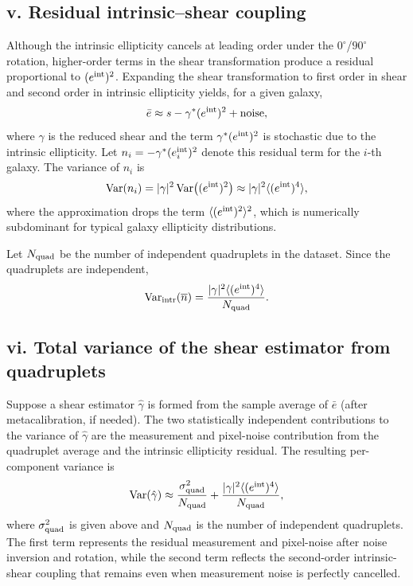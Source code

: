 \documentclass[11pt]{EuclidVIS}
\numberwithin{table}{section}
\numberwithin{figure}{section}
\begin{document}
\subsection*{v. Residual intrinsic--shear coupling}

Although the intrinsic ellipticity cancels at leading order under the
$0^\circ$/$90^\circ$ rotation, higher-order terms in the shear transformation
produce a residual proportional to $(e^{\rm int})^2$.
Expanding the shear transformation to first order in shear and second order in
intrinsic ellipticity yields, for a given galaxy,
\begin{equation}
\bar e \approx s - \gamma^\ast (e^{\rm int})^2 + \text{noise},
\end{equation}
where $\gamma$ is the reduced shear and the term
$\gamma^\ast (e^{\rm int})^2$ is stochastic due to the intrinsic ellipticity.
Let $n_i = -\gamma^\ast (e_i^{\rm int})^2$ denote this residual term for the
$i$-th galaxy.
The variance of $n_i$ is
\begin{equation}
\mathrm{Var}(n_i)
= |\gamma|^2\,\mathrm{Var}\!\left((e^{\rm int})^2\right)
\approx |\gamma|^2\langle (e^{\rm int})^4\rangle,
\end{equation}
where the approximation drops the term
$\langle (e^{\rm int})^2\rangle^2$, which is numerically subdominant for
typical galaxy ellipticity distributions.

Let $N_{\rm quad}$ be the number of independent quadruplets in the dataset.
Since the quadruplets are independent,
\begin{equation}
\mathrm{Var}_{\rm intr}(\overline{n})
= \frac{|\gamma|^2\langle (e^{\rm int})^4\rangle}{N_{\rm quad}}.
\end{equation}

\subsection*{vi. Total variance of the shear estimator from quadruplets}

Suppose a shear estimator $\hat\gamma$ is formed from the sample average
of $\bar e$ (after metacalibration, if needed).
The two statistically independent contributions to the variance of
$\hat\gamma$ are the measurement and pixel-noise contribution from the
quadruplet average and the intrinsic ellipticity residual.
The resulting per-component variance is
\begin{equation}
\mathrm{Var}(\hat\gamma)
\approx
\frac{\sigma_{\rm quad}^2}{N_{\rm quad}}
+
\frac{|\gamma|^2\langle (e^{\rm int})^4\rangle}{N_{\rm quad}},
\end{equation}
where $\sigma_{\rm quad}^2$ is given above and
$N_{\rm quad}$ is the number of independent quadruplets.
The first term represents the residual measurement and pixel-noise after
noise inversion and rotation, while the second term reflects the 
second-order intrinsic-shear coupling that remains even when measurement 
noise is perfectly cancelled.
\end{document}
